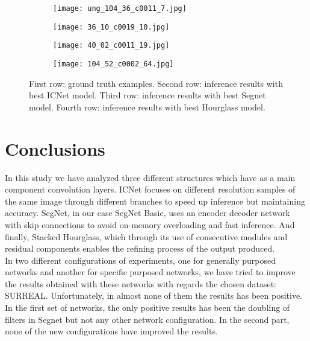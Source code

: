 \begin{figure}
\begin{subfigure}{.198\textwidth}
\centering
  \texttt{[image: ung\_104\_36\_c0011\_7.jpg]}
\end{subfigure}%
\begin{subfigure}{.19\textwidth}
  \centering
  \texttt{[image: 36\_10\_c0019\_10.jpg]}
\end{subfigure}
\begin{subfigure}{.19\textwidth}
  \centering
  \texttt{[image: 40\_02\_c0011\_19.jpg]}
\end{subfigure}
\begin{subfigure}{.189\textwidth}
  \centering
  \texttt{[image: 104\_52\_c0002\_64.jpg]}
\end{subfigure}

\caption{First row: ground truth examples.  Second row: inference results with best ICNet model. Third row: inference results with best Segnet model. Fourth row: inference results with best Hourglass model.}
\label{final:inference}
\end{figure}

 



\section{Conclusions}
 	   
In this study we have analyzed three different structures which have as a main component convolution layers. ICNet focuses on different resolution samples of the same image through different branches to speed up inference but maintaining accuracy. SegNet, in our case SegNet Basic, uses an encoder decoder network with skip connections to avoid on-memory overloading and fast inference. And finally, Stacked Hourglass, which through its use of consecutive modules and residual components enables the refining process of the output produced. \\

In two different configurations of experiments, one for generally purposed networks and another for specific purposed networks, we have tried to improve the results obtained with these networks with regards the chosen dataset: SURREAL. Unfortunately, in almost none of them the results has been positive. In the first set of networks, the only positive results has been the doubling of filters in Segnet but not any other network configuration. In the second part, none of the new configurations have improved the results.\\

